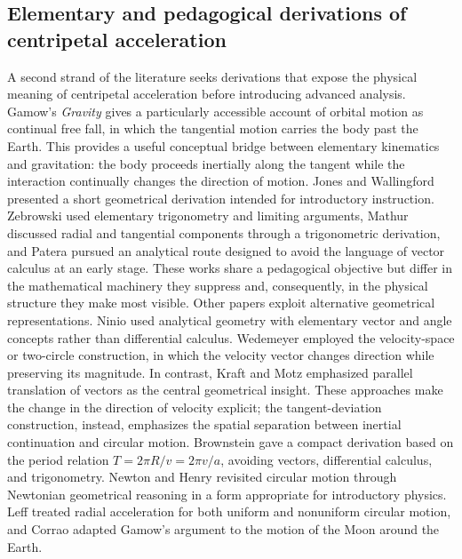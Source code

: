 \documentclass[preprint,12pt,3p,nopreprintline]{elsarticle}
\numberwithin{equation}{section}
\theoremstyle{remark}
\begin{document}
\subsection{Elementary and pedagogical derivations of centripetal acceleration}

A second strand of the literature seeks derivations that expose the physical meaning of centripetal acceleration before introducing advanced analysis. Gamow's \textit{Gravity} \cite{gamow1962gravity} gives a particularly accessible account of orbital motion as continual free fall, in which the tangential motion carries the body past the Earth. This provides a useful conceptual bridge between elementary kinematics and gravitation: the body proceeds inertially along the tangent while the interaction continually changes the direction of motion. Jones and Wallingford \cite{jones1969simple} presented a short geometrical derivation intended for introductory instruction. Zebrowski \cite{zebrowski1972derivation} used elementary trigonometry and limiting arguments, Mathur \cite{Mathur1974} discussed radial and tangential components through a trigonometric derivation, and Patera \cite{patera1975deriving} pursued an analytical route designed to avoid the language of vector calculus at an early stage. These works share a pedagogical objective but differ in the mathematical machinery they suppress and, consequently, in the physical structure they make most visible. Other papers exploit alternative geometrical representations. Ninio \cite{ninio1993} used analytical geometry with elementary vector and angle concepts rather than differential calculus. Wedemeyer \cite{wedemeyer1993centripetal} employed the velocity-space or two-circle construction, in which the velocity vector changes direction while preserving its magnitude.
In contrast, Kraft and Motz \cite{kraft1995geometric} emphasized parallel translation of vectors as the central geometrical insight. These approaches make the change in the direction of velocity explicit; the tangent-deviation construction, instead, emphasizes the spatial separation between inertial continuation and circular motion. Brownstein \cite{brownstein1994simple} gave a compact derivation based on the period relation $T=2\pi R/v=2\pi v/a$, avoiding vectors, differential calculus, and trigonometry. Newton and Henry \cite{newton2000circular} revisited circular motion through Newtonian geometrical reasoning in a form appropriate for introductory physics. Leff \cite{leff2002acceleration} treated radial acceleration for both uniform and nonuniform circular motion, and Corrao \cite{corrao2012gamow} adapted Gamow's argument to the motion of the Moon around the Earth.
\end{document}
